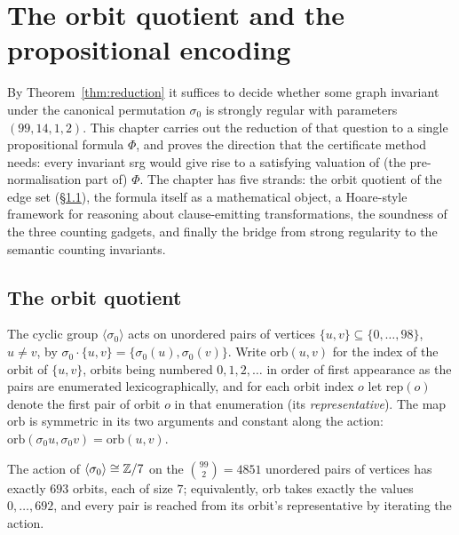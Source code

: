 \chapter{The orbit quotient and the propositional encoding}\label{sec:encoding}

By Theorem~\ref{thm:reduction} it suffices to decide whether some graph
invariant under the canonical permutation $\sigma_0$ is strongly regular with
parameters $(99,14,1,2)$.  This chapter carries out the reduction of that
question to a single propositional formula $\Phi$, and proves the direction
that the certificate method needs: every invariant srg would give rise to a
satisfying valuation of (the pre-normalisation part of) $\Phi$.  The chapter
has five strands: the orbit quotient of the edge set (\S\ref{ssec:enc-orbits}),
the formula itself as a mathematical object, a Hoare-style framework for
reasoning about clause-emitting transformations, the soundness of the three
counting gadgets, and finally the bridge from strong regularity to the
semantic counting invariants.

\section{The orbit quotient}\label{ssec:enc-orbits}

\begin{definition}\label{def:enc-orbitmap}
The cyclic group $\langle\sigma_0\rangle$ acts on unordered pairs of vertices
$\{u,v\} \subseteq \{0,\dots,98\}$, $u \neq v$, by
$\sigma_0\cdot\{u,v\} = \{\sigma_0(u),\sigma_0(v)\}$.  Write
$\mathrm{orb}(u,v)$ for the index of the orbit of $\{u,v\}$, orbits being
numbered $0,1,2,\dots$ in order of first appearance as the pairs are
enumerated lexicographically, and for each orbit index $o$ let
$\mathrm{rep}(o)$ denote the first pair of orbit $o$ in that enumeration (its
\emph{representative}).  The map $\mathrm{orb}$ is symmetric in its two
arguments and constant along the action:
$\mathrm{orb}(\sigma_0 u, \sigma_0 v) = \mathrm{orb}(u,v)$.
\leanok
{}
\end{definition}

\begin{lemma}\label{lem:orbits}
The action of $\langle\sigma_0\rangle \cong \mathbb{Z}/7$ on the $\binom{99}{2}
= 4851$ unordered pairs of vertices has exactly $693$ orbits, each of size
$7$; equivalently, $\mathrm{orb}$ takes exactly the values $0,\dots,692$, and
every pair is reached from its orbit's representative by iterating the
action.
\leanok
{}
\end{lemma}

